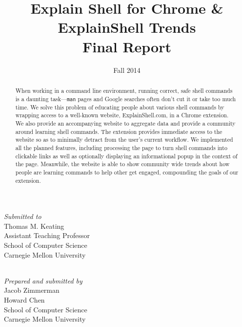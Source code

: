 \documentclass[11pt]{article}
\title{Explain Shell for Chrome \& ExplainShell Trends\\Final Report}
\author{}
\date{Fall 2014}
\begin{document}


\thispagestyle{empty}
\maketitle
\thispagestyle{empty}

\begin{center}
  \textit{Submitted to} \\
  Thomas M. Keating \\
  Assistant Teaching Professor \\
  School of Computer Science \\
  Carnegie Mellon University

  \mbox{} \\

  \textit{Prepared and submitted by} \\
  Jacob Zimmerman \\
  Howard Chen \\
  School of Computer Science \\
  Carnegie Mellon University

  \mbox{} \\
\end{center}

\begin{abstract}
  When working in a command line environment, running correct, safe shell
  commands is a daunting task---\texttt{man} pages and Google searches often
  don't cut it or take too much time. We solve this problem of educating people
  about various shell commands by wrapping access to a well-known website,
  ExplainShell.com, in a Chrome extension.  We also provide an accompanying
  website to aggregate data and provide a community around learning shell
  commands. The extension provides immediate access to the website so as to
  minimally detract from the user's current workflow. We implemented all the
  planned features, including processing the page to turn shell commands into
  clickable links as well as optionally displaying an informational popup in
  the context of the page. Meanwhile, the website is able to show community
  wide trends about how people are learning commands to help other get engaged,
  compounding the goals of our extension.
\end{abstract}

\newpage
\end{document}
